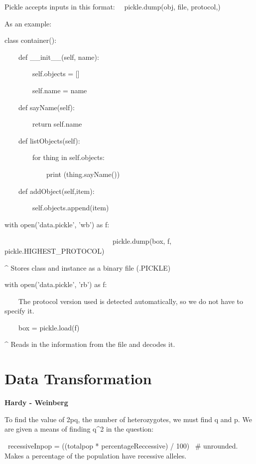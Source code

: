 \documentclass[a4paper,12pt]{report}
\begin{document}
Pickle accepts inputs in this format: \ \ pickle.dump(obj, file, protocol,)

As an example: \ 
\bigskip

class container():

\ \ \ \ def \_\_init\_\_(self, name):

\ \ \ \ \ \ \ \ self.objects = []

\ \ \ \ \ \ \ \ self.name = name


\bigskip

\ \ \ \ def sayName(self):

\ \ \ \ \ \ \ \ return self.name


\bigskip

\ \ \ \ def listObjects(self):

\ \ \ \ \ \ \ \ for thing in self.objects:

\ \ \ \ \ \ \ \ \ \ \ \ print (thing.sayName())


\bigskip

\ \ \ \ def addObject(self,item):

\ \ \ \ \ \ \ \ self.objects.append(item)


\bigskip


with open('data.pickle', 'wb') as f:

\ \ \ \ \ \ \ \ \ \ \ \ \ \ \ \ \ \ \ \ \ \ \ \ \ \ \ \ \ \ \ pickle.dump(box, f, pickle.HIGHEST\_PROTOCOL)


\bigskip

\^{} Stores class and instance as a binary file (.PICKLE)


\bigskip


\bigskip

with open('data.pickle', 'rb') as f:

\ \ \ \ The protocol version used is detected automatically, so we do not have to specify it.

\ \ \ \ box = pickle.load(f)


\bigskip

\^{} Reads in the information from the file and decodes it.


\bigskip


\bigskip

\section{Data Transformation}


\bigskip


\bigskip
\begin{flushleft}
\textbf{Hardy - Weinberg}

To find the value of 2pq, the number of heterozygotes, we must find q and p. We are given a means of finding q\^{}2 in the question:
\end{flushleft}
\ recessiveInpop = ((totalpop * percentageReccessive) / 100) \ \# unrounded. Makes a percentage of the population have recessive alleles.
\end{document}
